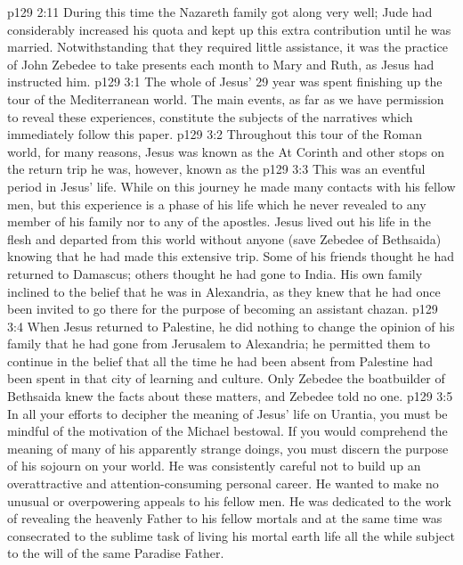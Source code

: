 \vs p129 2:11 \pc During this time the Nazareth family got along very well; Jude had considerably increased his quota and kept up this extra contribution until he was married. Notwithstanding that they required little assistance, it was the practice of John Zebedee to take presents each month to Mary and Ruth, as Jesus had instructed him.
\vs p129 3:1 The whole of Jesus’ 29 year was spent finishing up the tour of the Mediterranean world. The main events, as far as we have permission to reveal these experiences, constitute the subjects of the narratives which immediately follow this paper.
\vs p129 3:2 \pc Throughout this tour of the Roman world, for many reasons, Jesus was known as the  At Corinth and other stops on the return trip he was, however, known as the 
\vs p129 3:3 This was an eventful period in Jesus’ life. While on this journey he made many contacts with his fellow men, but this experience is a phase of his life which he never revealed to any member of his family nor to any of the apostles. Jesus lived out his life in the flesh and departed from this world without anyone (save Zebedee of Bethsaida) knowing that he had made this extensive trip. Some of his friends thought he had returned to Damascus; others thought he had gone to India. His own family inclined to the belief that he was in Alexandria, as they knew that he had once been invited to go there for the purpose of becoming an assistant chazan.
\vs p129 3:4 When Jesus returned to Palestine, he did nothing to change the opinion of his family that he had gone from Jerusalem to Alexandria; he permitted them to continue in the belief that all the time he had been absent from Palestine had been spent in that city of learning and culture. Only Zebedee the boatbuilder of Bethsaida knew the facts about these matters, and Zebedee told no one.
\vs p129 3:5 \pc In all your efforts to decipher the meaning of Jesus’ life on Urantia, you must be mindful of the motivation of the Michael bestowal. If you would comprehend the meaning of many of his apparently strange doings, you must discern the purpose of his sojourn on your world. He was consistently careful not to build up an overattractive and attention\hyp{}consuming personal career. He wanted to make no unusual or overpowering appeals to his fellow men. He was dedicated to the work of revealing the heavenly Father to his fellow mortals and at the same time was consecrated to the sublime task of living his mortal earth life all the while subject to the will of the same Paradise Father.
